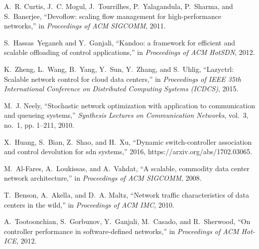 \documentclass[10pt,journal,compsoc]{IEEEtran}
\begin{document}
\begin{thebibliography}{1}
A.~R. Curtis, J.~C. Mogul, J.~Tourrilhes, P.~Yalagandula, P.~Sharma, and
  S.~Banerjee, ``Devoflow: scaling flow management for high-performance
  networks,'' in \emph{Proceedings of ACM SIGCOMM}, 2011.

S.~Hassas~Yeganeh and Y.~Ganjali, ``Kandoo: a framework for efficient and
  scalable offloading of control applications,'' in \emph{Proceedings of ACM
  HotSDN}, 2012.

K.~Zheng, L.~Wang, B.~Yang, Y.~Sun, Y.~Zhang, and S.~Uhlig, ``Lazyctrl:
  Scalable network control for cloud data centers,'' in \emph{Proceedings of
  IEEE 35th International Conference on Distributed Computing Systems (ICDCS)},
  2015.

M.~J. Neely, ``Stochastic network optimization with application to
  communication and queueing systems,'' \emph{Synthesis Lectures on
  Communication Networks}, vol.~3, no.~1, pp. 1--211, 2010.

X.~Huang, S.~Bian, Z.~Shao, and H.~Xu, ``Dynamic switch-controller association
  and control devolution for sdn systems,'' 2016,
  https://arxiv.org/abs/1702.03065.

M.~Al-Fares, A.~Loukissas, and A.~Vahdat, ``A scalable, commodity data center
  network architecture,'' in \emph{Proceedings of ACM SIGCOMM}, 2008.

T.~Benson, A.~Akella, and D.~A. Maltz, ``Network traffic characteristics of
  data centers in the wild,'' in \emph{Proceedings of ACM IMC}, 2010.

A.~Tootoonchian, S.~Gorbunov, Y.~Ganjali, M.~Casado, and R.~Sherwood, ``On
  controller performance in software-defined networks,'' in \emph{Proceedings
  of ACM Hot-ICE}, 2012.

\end{thebibliography}

% 
\end{document}
